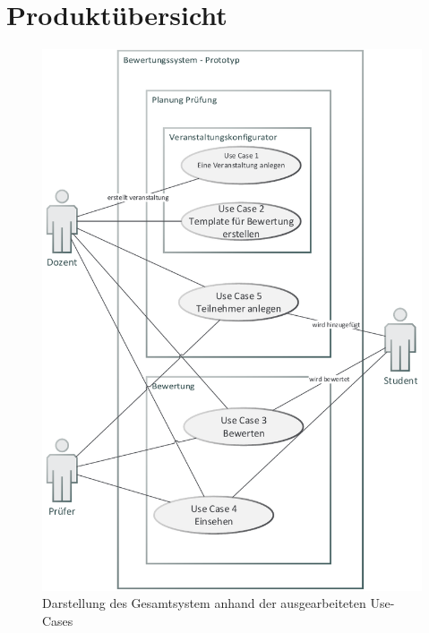 		
		
		
		
	\section{Produktübersicht}
	
	\begin{figure}[th!]
	\centering
	\includegraphics[width=\textwidth]{./img/use_case}
	\caption{Darstellung des Gesamtsystem anhand der ausgearbeiteten Use-Cases}
	\label{fig:use_case}
	\end{figure}
	
